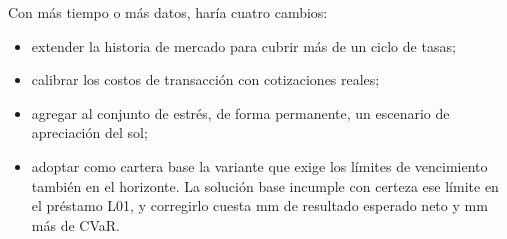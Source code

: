 Con más tiempo o más datos, haría cuatro cambios:
\begin{itemize}
  \item extender la historia de mercado para cubrir más de un ciclo de tasas;
  \item calibrar los costos de transacción con cotizaciones reales;
  \item agregar al conjunto de estrés, de forma permanente, un escenario de apreciación del sol;
  \item adoptar como cartera base la variante que exige los límites de vencimiento también en el horizonte.
    La solución base incumple con certeza ese límite en el préstamo L01, y corregirlo cuesta
     mm de resultado esperado neto y  mm más de CVaR.
\end{itemize}
